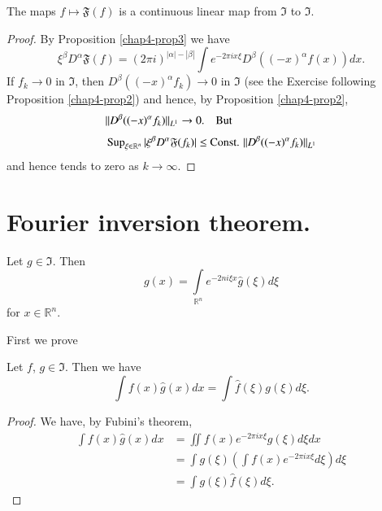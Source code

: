 \begin{proposition}\label{chap4-prop5}
The maps $f\mapsto \mathfrak{F}(f)$ is a continuous linear map from
$\mathfrak{I}$ to $\mathfrak{I}$.
\end{proposition}

\begin{proof}
By Proposition \ref{chap4-prop3} we have
$$
\xi^{\beta}D^{\alpha}\mathfrak{F}(f)=(2\pi i)^{|\alpha|-|\beta|}\int
e^{-2\pi ix\xi}D^{\beta}((-x)^{\alpha}f(x))dx.
$$
If $f_{k}\to 0$ in $\mathfrak{I}$, then
$D^{\beta}((-x)^{\alpha}f_{k})\to 0$ in $\mathfrak{I}$ (see the
Exercise following Proposition \ref{chap4-prop2}) and hence, by
Proposition \ref{chap4-prop2},
\begin{align*}
& ||D^{\beta}((-x)^{\alpha}f_{k})||_{L^{1}}\to
  0.\quad\text{But}\\[3pt]
& \operatorname{Sup}\limits_{\xi\in
    \mathbb{R}^{n}}|\xi^{\beta}D^{\alpha}\mathfrak{F}(f_{k})|\leq
  \text{Const. } ||D^{\beta}((-x)^{\alpha}f_{k})||_{L^{1}}
\end{align*}
and hence tends to zero as $k\to \infty$.
\end{proof}

\section*{Fourier inversion theorem.}

\setcounter{theorem}{0}
\begin{theorem}\label{chap4-thm1}
Let $g\in \mathfrak{I}$. Then
$$
g(x)=\int\limits_{\mathbb{R}^{n}}e^{-2n i \xi x}\widehat{g}(\xi)d\xi
$$
for $x\in \mathbb{R}^{n}$.
\end{theorem}

First we prove

\setcounter{lemma}{0}
\begin{lemma}\label{chap4-lem1}
Let $f$, $g\in \mathfrak{I}$. Then we have
$$
\int f(x)\widehat{g}(x)dx=\int \widehat{f}(\xi)g(\xi)d\xi.
$$
\end{lemma}

\begin{proof}
We have, by Fubini's theorem,
\begin{align*}
\int f(x)\widehat{g}(x)dx &= \iint f(x)e^{-2\pi ix\xi}g(\xi)d\xi
dx\\[3pt]
&= \int g(\xi)\left(\int f(x)e^{-2\pi ix\xi}d\xi\right)d\xi\\[3pt]
&= \int g(\xi)\widehat{f}(\xi)d\xi.
\end{align*}\pageoriginale
\end{proof}

